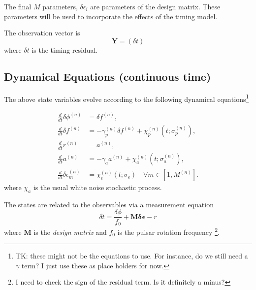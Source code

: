 \documentclass{tufte-handout} %
\begin{document}
\noindent The final $M$ parameters, $\delta \epsilon_i$ are parameters of the design matrix. These parameters will be used to incorporate the effects of the timing model. \newline 



\noindent The observation vector is 
\begin{equation}
	\boldsymbol{Y} = \left(\delta t \right)
\end{equation}
where $\delta t$ is the timing residual.


\subsection{Dynamical Equations (continuous time)}

The above state variables evolve according to the following dynamical equations\footnote{TK: these might not be the equations to use. For instance, do we still need a $\gamma$ term? I just use these as place holders for now.}


\begin{align}
	\frac{d}{dt} \delta \phi^{(n)} &= \delta f^{(n)}, \\
	\frac{d}{dt} \delta f^{(n)} &= -\gamma_p^{(n)} \delta f^{(n)} + \chi_p^{(n)}(t;\sigma_p^{(n)}), \\
	\frac{d}{dt} r^{(n)} &= a^{(n)}, \\
	\frac{d}{dt} a^{(n)} &= -\gamma_a a^{(n)} + \chi_a^{(n)}(t;\sigma_a^{(n)}), \\
	\frac{d}{dt} \delta \epsilon^{(n)}_{m} &= \chi_\epsilon^{(n)}(t;\sigma_\epsilon) \quad \forall m \in [1, M^{(n)}].
\end{align}
where $\chi_a$ is the usual white noise stochastic process. \newline 



\noindent The states are related to the observables via a measurement equation
\begin{equation}
	\delta t = \frac{\delta \phi}{f_0} + \mathbf{M} \mathbf{\delta \epsilon} - r
\end{equation}
where  $\mathbf{M}$ is the \textit{design matrix} and $f_0$ is the pulsar rotation frequency \footnote{I need to check the sign of the residual term. Is it definitely a minus?}. \newline 
\end{document}
